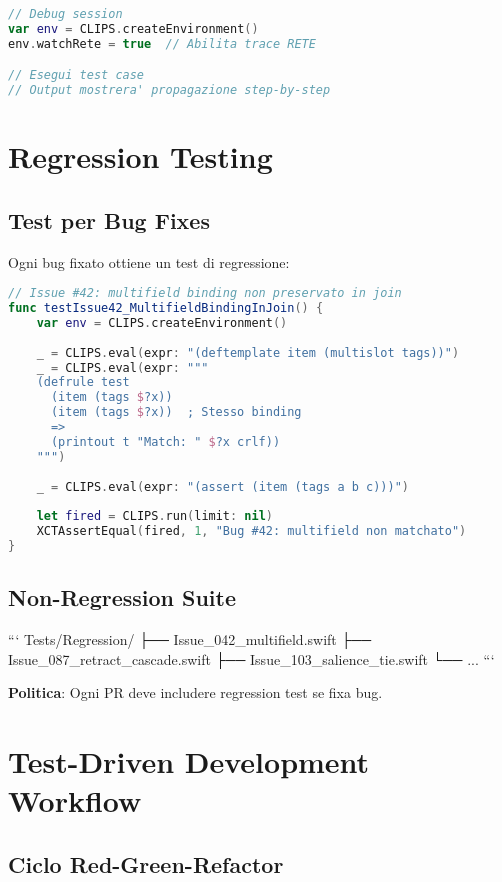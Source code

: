 \begin{lstlisting}[language=Swift]
// Debug session
var env = CLIPS.createEnvironment()
env.watchRete = true  // Abilita trace RETE

// Esegui test case
// Output mostrera' propagazione step-by-step
\end{lstlisting}

\section{Regression Testing}

\subsection{Test per Bug Fixes}

Ogni bug fixato ottiene un test di regressione:

\begin{lstlisting}[language=Swift]
// Issue #42: multifield binding non preservato in join
func testIssue42_MultifieldBindingInJoin() {
    var env = CLIPS.createEnvironment()
    
    _ = CLIPS.eval(expr: "(deftemplate item (multislot tags))")
    _ = CLIPS.eval(expr: """
    (defrule test
      (item (tags $?x))
      (item (tags $?x))  ; Stesso binding
      =>
      (printout t "Match: " $?x crlf))
    """)
    
    _ = CLIPS.eval(expr: "(assert (item (tags a b c)))")
    
    let fired = CLIPS.run(limit: nil)
    XCTAssertEqual(fired, 1, "Bug #42: multifield non matchato")
}
\end{lstlisting}

\subsection{Non-Regression Suite}

```
Tests/Regression/
├── Issue_042_multifield.swift
├── Issue_087_retract_cascade.swift
├── Issue_103_salience_tie.swift
└── ...
```

\textbf{Politica}: Ogni PR deve includere regression test se fixa bug.

\section{Test-Driven Development Workflow}

\subsection{Ciclo Red-Green-Refactor}

